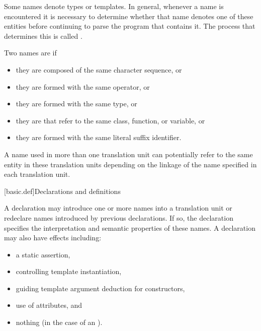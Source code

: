 \pnum
Some names denote types or templates. In general,
whenever a name is encountered it is necessary to determine whether that name denotes
one of these entities before continuing to parse the program that contains it. The
process that determines this is called
.

\pnum
Two names are  if
\begin{itemize}
\item they are  composed of the same character sequence, or
\item they are  formed with
the same operator, or
\item they are  formed
with the same type, or
\item they are  that refer to the same class,
function, or variable, or
\item they are  formed with
the same literal suffix identifier.
\end{itemize}

\pnum
{}%
%
A name used in more than one translation unit can potentially
refer to the same entity in these translation units depending on the
linkage of the name specified in each
translation unit.

[basic.def]{Declarations and definitions}

\pnum
{}%
%
%
A declaration may introduce
one or more names into a translation
unit or redeclare names introduced by previous declarations.
If so, the
declaration specifies the interpretation and semantic properties of these names.
A declaration may also have effects including:
\begin{itemize}
\item a static assertion,
\item controlling template instantiation,
\item guiding template argument deduction for constructors,
\item use of attributes, and
\item nothing (in the case of an ).
\end{itemize}

